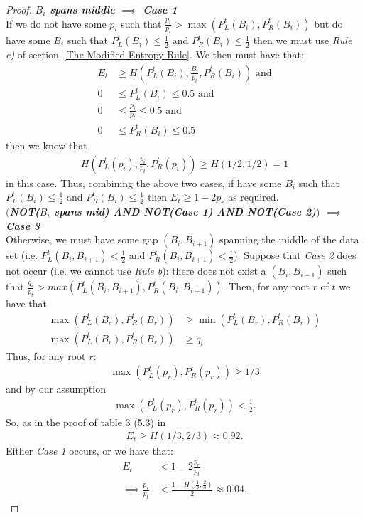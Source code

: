 \documentclass[letterpaper,12pt,titlepage,oneside,final]{book}
\theoremstyle{plain}
\begin{document}
\begin{proof}
\noindent\textbf{\textit{$B_i$ spans middle $\implies$ Case 1}} \\
If we do not have some $p_i$ such that $\frac{p_i}{p_t} > \max(P^t_L(B_i), P^t_R(B_i))$ but do have some $B_i$ such that $P^t_L(B_i) \leq \frac{1}{2}$ and $P^t_R(B_i) \leq \frac{1}{2}$ then we must use \textit{Rule c)} of section~\ref{The Modified Entropy Rule}. We then must have that:
\begin{align*}
 E_t &\geq H(P^t_L(B_i), \frac{B_i}{p_t} , P^t_R(B_i)) \text{ and} \\
 0 &\leq P^t_L(B_i) \leq 0.5 \text{ and}\\
 0 &\leq \frac{p_i}{p_t} \leq 0.5 \text{ and}\\
 0 &\leq P^t_R(B_i) \leq 0.5
\end{align*} 
   then we know that \\
\begin{align*}
H(P^t_L(p_i), \frac{p_i}{p_t} , P^t_R(p_i)) \geq H(1/2, 1/2) = 1
\end{align*}
in this case.
 Thus, combining the above two cases, if have some $B_i$ such that $P^t_L(B_i) \leq \frac{1}{2}$ and $P^t_R(B_i) \leq \frac{1}{2}$ then $E_t \geq 1-2p_r$ as required. \\

\noindent\textbf{\textit{$\big($NOT($B_i$ spans mid) AND NOT(Case 1) AND NOT(Case 2)$\big)$ $\implies$ Case 3}} \\
Otherwise, we must have some gap $(B_i, B_{i+1})$ spanning the middle of the data set (i.e. $P^t_L(B_i, B_{i+1}) < \frac{1}{2}$ and $P^t_R(B_i, B_{i+1}) < \frac{1}{2}$). Suppose that \textit{Case 2} does not occur (i.e. we cannot use \textit{Rule b}): there does not exist a $(B_i, B_{i+1})$ such that $\frac{q_i}{p_t} > max(P^t_L(B_i, B_{i+1}), P^t_R(B_i, B_{i+1}))$. Then, for any root $r$ of $t$ we have that \\
\begin{align*}
\max(P^t_L(B_r), P^t_R(B_r)) &\geq \min(P^t_L(B_r), P^t_R(B_r))\\ 
\max(P^t_L(B_r), P^t_R(B_r)) &\geq q_i
\end{align*}
Thus, for any root $r$:
\begin{align*}
\max(P^t_L(p_r), P^t_R(p_r)) \geq 1/3
\end{align*}
 and by our assumption 
\begin{align*}
\max(P^t_L(p_r), P^t_R(p_r)) < \frac{1}{2}.
\end{align*}
 So, as in the proof of table 3 (5.3) in \cite{guttler1980binary}\\
\begin{align*}
E_t \geq H(1/3, 2/3) \approx 0.92.
\end{align*}
Either \textit{Case 1} occurs, or we have that:
\begin{align*}
E_t &< 1-2\frac{p_r}{p_t} \\
\implies \frac{p_r}{p_t} &< \frac{1-H(\frac{1}{3}, \frac{2}{3})}{2} \approx 0.04.
\end{align*}


\end{proof}
\end{document}
